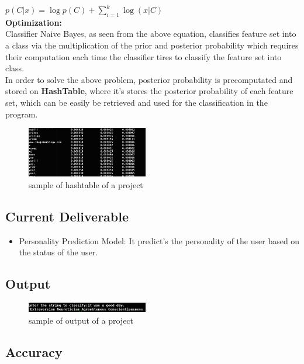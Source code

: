 \documentclass[a4paper, 12pt, onepage]{article}
\begin{document}
\begin{enumerate}
	$p(C|x) = \log p(C) + \sum_{i=1}^{k} \log(x|C) $
	\\
	\textbf{Optimization: }\\
	Classifier Naive Bayes, as seen from the above equation, classifies feature set into a class via the multiplication of the prior and posterior probability which requires their computation each time the classifier tires to classify the feature set into class. \\
	In order to solve the above problem, posterior probability is precomputated and stored on \textbf{HashTable}, where it's stores the posterior probability of each feature set, which can be easily be retrieved and used for the classification in the program.
      \begin{figure}[h!]
	      \centering
	      \includegraphics[width=200px]{hashtable.png}
	      \caption{sample of hashtable of a project}
	\end{figure}
	\end{enumerate}
	\subsection{Current Deliverable}
	\begin{itemize}
	\item Personality Prediction Model:
		It predict's the personality of the user based on the status of the user.
	\end{itemize}
\subsection{Output}
      \begin{figure}[h!]
	      \centering
	      \includegraphics[width=200px]{output.png}
	      \caption{sample of output of a project}
	\end{figure}
	\subsection{Accuracy}
\end{document}
